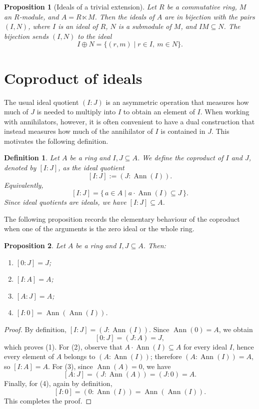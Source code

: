 \documentclass{amsart}
\newtheorem{proposition}{Proposition}
\newtheorem{definition}{Definition}
\DeclareMathOperator{\ann}{Ann}
\begin{document}
\begin{proposition}[Ideals of a trivial extension]\label{prop:ideals-trivial-extension}
Let $R$ be a commutative ring, $M$ an $R$-module, and $A=R\ltimes M$. Then the ideals of $A$ are in bijection with the pairs $(I,N)$, where $I$ is an ideal of $R$, $N$ is a submodule of $M$, and $I M\subseteq N$. The bijection sends $(I,N)$ to the ideal
\[
I\oplus N=\{(r,m)\mid r\in I,\ m\in N\}.
\]
\end{proposition}

\section{Coproduct of ideals}
\label{sec:coproduct}

The usual ideal quotient $(I:J)$ is an asymmetric operation that measures how much of $J$ is needed to multiply into $I$ to obtain an element of $I$. When working with annihilators, however, it is often convenient to have a dual construction that instead measures how much of the annihilator of $I$ is contained in $J$. This motivates the following definition.

\begin{definition}\label{def:coproduct}
Let $A$ be a ring and $I,J\subseteq A$. We define the \emph{coproduct} of $I$ and $J$, denoted by $[I:J]$, as the ideal quotient
\[
[I:J] := (J:\ann(I)).
\]
Equivalently,
\[
[I:J] = \{\, a \in A \mid a\cdot \ann(I) \subseteq J \,\}.
\]
Since ideal quotients are ideals, we have $[I:J]\subseteq A$.
\end{definition}

The following proposition records the elementary behaviour of the coproduct when one of the arguments is the zero ideal or the whole ring.

\begin{proposition}\label{prop:coprod-basic}
Let $A$ be a ring and $I,J\subseteq A$. Then:
\begin{enumerate}
  \item $[0:J]=J$;
  \item $[I:A]=A$;
  \item $[A:J]=A$;
  \item $[I:0]=\ann(\ann(I))$.
\end{enumerate}
\end{proposition}

\begin{proof}
By definition, $[I:J]=(J:\ann(I))$. Since $\ann(0)=A$, we obtain
\[
[0:J]=(J:A)=J,
\]
which proves (1). For (2), observe that $A\cdot \ann(I)\subseteq A$ for every ideal $I$, hence every element of $A$ belongs to $(A:\ann(I))$; therefore $(A:\ann(I))=A$, so $[I:A]=A$. For (3), since $\ann(A)=0$, we have
\[
[A:J]=(J:\ann(A))=(J:0)=A.
\]
Finally, for (4), again by definition,
\[
[I:0]=(0:\ann(I))=\ann(\ann(I)).
\]
This completes the proof.
\end{proof}
\end{document}
